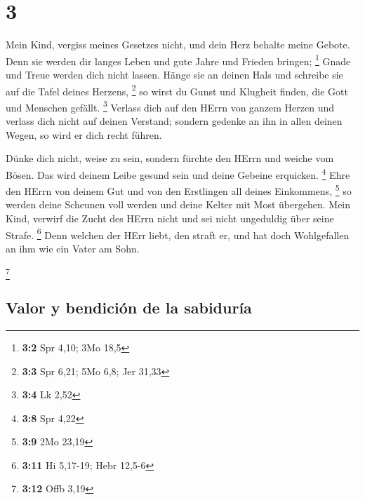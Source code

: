 \hypertarget{section-2}{%
\section{3}\label{section-2}}

 Mein Kind, vergiss meines Gesetzes nicht, und dein Herz
behalte meine Gebote.  Denn sie werden dir langes Leben
und gute Jahre und Frieden bringen; \footnote{\textbf{3:2} Spr 4,10; 3Mo
  18,5}  Gnade und Treue werden dich nicht lassen. Hänge
sie an deinen Hals und schreibe sie auf die Tafel deines Herzens,
\footnote{\textbf{3:3} Spr 6,21; 5Mo 6,8; Jer 31,33}  so
wirst du Gunst und Klugheit finden, die Gott und Menschen gefällt.
\footnote{\textbf{3:4} Lk 2,52}  Verlass dich auf den
HErrn von ganzem Herzen und verlass dich nicht auf deinen Verstand;
 sondern gedenke an ihn in allen deinen Wegen, so wird er
dich recht führen.

 Dünke dich nicht, weise zu sein, sondern fürchte den
HErrn und weiche vom Bösen.  Das wird deinem Leibe gesund
sein und deine Gebeine erquicken. \footnote{\textbf{3:8} Spr 4,22}
 Ehre den HErrn von deinem Gut und von den Erstlingen all
deines Einkommens, \footnote{\textbf{3:9} 2Mo 23,19}  so
werden deine Scheunen voll werden und deine Kelter mit Most übergehen.
 Mein Kind, verwirf die Zucht des HErrn nicht und sei
nicht ungeduldig über seine Strafe. \footnote{\textbf{3:11} Hi 5,17-19;
  Hebr 12,5-6}  Denn welchen der HErr liebt, den straft
er, und hat doch Wohlgefallen an ihm wie ein Vater am Sohn.

\footnote{\textbf{3:12} Offb 3,19}

\hypertarget{valor-y-bendiciuxf3n-de-la-sabiduruxeda}{%
\subsection{Valor y bendición de la
sabiduría}\label{valor-y-bendiciuxf3n-de-la-sabiduruxeda}}


